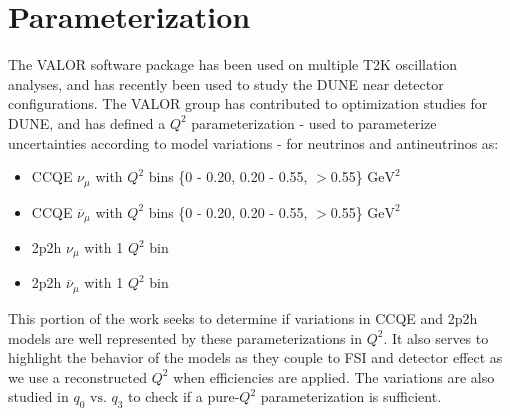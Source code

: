 \documentclass[12pt]{article}
\begin{document}
\section{Parameterization}
The VALOR software package has been used on multiple T2K oscillation analyses, and has recently been used to study the DUNE near detector configurations. %
The VALOR group has contributed to optimization studies for DUNE\cite{VALOR}, and has defined a $Q^2$ parameterization  - used to parameterize uncertainties according to model variations - for neutrinos and antineutrinos as: 
\begin{itemize}
\item CCQE $\nu_{\mu}$ with $Q^2$ bins \{0 - 0.20, 0.20 - 0.55, $>$0.55\} $\textrm{GeV}^2$
\item CCQE $\overline{\nu}_{\mu}$ with $Q^2$ bins \{0 - 0.20, 0.20 - 0.55, $>$0.55\} $\textrm{GeV}^2$
\item 2p2h $\nu_{\mu}$ with 1 $Q^2$ bin 
\item 2p2h $\overline{\nu}_{\mu}$ with 1 $Q^2$ bin
\end{itemize}

This portion of the work seeks to determine if variations in CCQE and 2p2h models are well represented by these parameterizations in $Q^2$. It also serves to highlight the behavior of the models as they couple to FSI and detector effect as we use a reconstructed $Q^2$ when efficiencies are applied. The variations are also studied in $q_0 \textrm{ vs. } q_3$ to check if a pure-$Q^2$ parameterization is sufficient.
\end{document}
